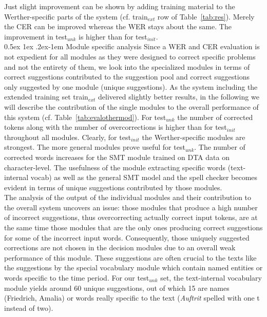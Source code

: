 \documentclass[11pt,letterpaper]{article}
\makeatletter
\renewcommand{\paragraph}{%
  \@startsection{paragraph}{4}%
  {\z@}{0.5ex \@plus 1ex \@minus .2ex}{-1em}%
  {\normalfont\normalsize\bfseries}%
}
\makeatother
\begin{document}
Just slight improvement can be shown by adding training material to the Werther-specific parts of the system (cf. train$_{ext}$ row of Table~\ref{tab:res}). Merely the CER can be improved whereas the WER stays about the same. The improvement in test$_{unk}$ is higher than for test$_{init}$.\\
\hspace{-0.3cm}
\paragraph{Module specific analysis}
Since a WER and CER evaluation is not expedient for all modules as they were designed to correct specific problems and not the entirety of them, we look into the specialized modules in terms of correct suggestions contributed to the suggestion pool and correct suggestions only suggested by one module (unique suggestions). As the system including the extended training set train$_{ext}$ delivered slightly better results, in the following we will describe the contribution of the single modules to the overall performance of this system (cf. Table~\ref{tab:evalothermod}). For test$_{unk}$ the number of corrected tokens along with the number of overcorrections is higher than for test$_{init}$ throughout all modules. Clearly, for test$_{init}$ the Werther-specific modules are strongest. The more general modules prove useful for test$_{unk}$. The number of corrected words increases for the SMT module trained on DTA data on character-level. The usefulness of the module extracting specific words (text-internal vocab) as well as the general SMT model and the spell checker becomes evident in terms of unique suggestions contributed by those modules.\\
The analysis of the output of the individual modules and their contribution to the overall system uncovers an issue: those modules that produce a high number of incorrect suggestions, thus overcorrecting actually correct input tokens, are at the same time those modules that are the only ones producing correct suggestions for some of the incorrect input words. Consequently, those uniquely suggested corrections are not chosen in the decision modules due to an overall weak performance of this module. These suggestions are often crucial to the texts like the suggestions by the special vocabulary module which contain named entities or words specific to the time period. For our test$_{unk}$ set, the text-internal vocabulary module yields around 60 unique suggestions, out of which 15 are names (Friedrich, Amalia) or words really specific to the text (\textit{Auftrit} spelled with one t instead of two).\\
\end{document}
